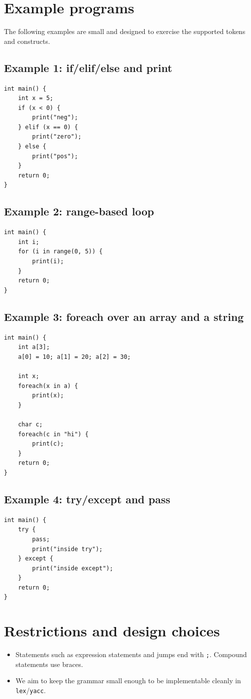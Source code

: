 \documentclass[11pt]{article}
\begin{document}
\section{Example programs}
The following examples are small and designed to exercise the supported tokens and constructs.

\subsection*{Example 1: if/elif/else and print}
\begin{lstlisting}
int main() {
	int x = 5;
	if (x < 0) {
		print("neg");
	} elif (x == 0) {
		print("zero");
	} else {
		print("pos");
	}
	return 0;
}
\end{lstlisting}

\subsection*{Example 2: range-based loop}
\begin{lstlisting}
int main() {
	int i;
	for (i in range(0, 5)) {
		print(i);
	}
	return 0;
}
\end{lstlisting}

\subsection*{Example 3: foreach over an array and a string}
\begin{lstlisting}
int main() {
	int a[3];
	a[0] = 10; a[1] = 20; a[2] = 30;

	int x;
	foreach(x in a) {
		print(x);
	}

	char c;
	foreach(c in "hi") {
		print(c);
	}
	return 0;
}
\end{lstlisting}

\subsection*{Example 4: try/except and pass}
\begin{lstlisting}
int main() {
	try {
		pass;
		print("inside try");
	} except {
		print("inside except");
	}
	return 0;
}
\end{lstlisting}

\section{Restrictions and design choices}
\begin{itemize}
	\item Statements such as expression statements and jumps end with \texttt{;}. Compound statements use braces.
	\item We aim to keep the grammar small enough to be implementable cleanly in \texttt{lex}/\texttt{yacc}.
\end{itemize}
\end{document}
